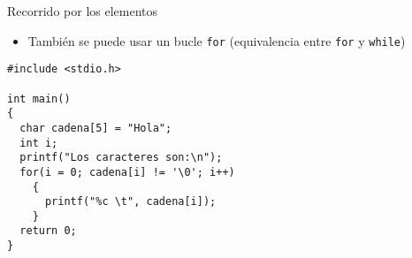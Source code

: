 \documentclass[xcolor={usenames,svgnames,dvipsnames}, aspectratio=169]{beamer}
\begin{document}
\begin{frame}[label={sec:org09b08aa},fragile]{Recorrido por los elementos}
 \begin{itemize}
\item También se puede usar un bucle \texttt{for} (equivalencia entre \texttt{for} y \texttt{while})
\end{itemize}

\lstset{language=C,label= ,caption= ,captionpos=b,numbers=none}
\begin{lstlisting}
#include <stdio.h>

int main()
{
  char cadena[5] = "Hola";
  int i;
  printf("Los caracteres son:\n");
  for(i = 0; cadena[i] != '\0'; i++)
    {
      printf("%c \t", cadena[i]);
    }
  return 0;
}
\end{lstlisting}
\end{frame}
\end{document}
